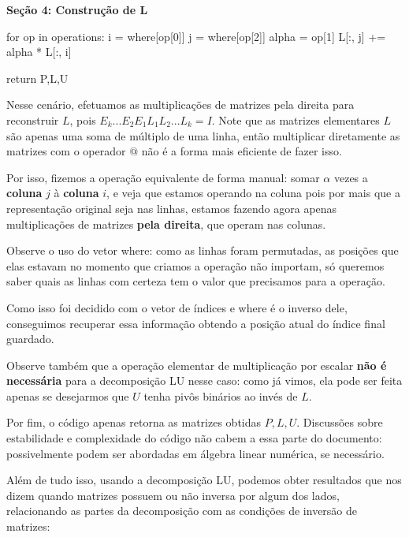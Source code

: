 \documentclass[11pt, a4paper]{article}
\begin{document}
\textbf{Seção 4: Construção de L}
\begin{code}
    for op in operations:
        i = where[op[0]]
        j = where[op[2]]
        alpha = op[1]
        L[:, j] += alpha * L[:, i]

    return P,L,U
\end{code}

Nesse cenário, efetuamos as multiplicações de matrizes pela direita para reconstruir \(L\), pois \(E_k...E_2E_1L_1L_2...L_k=I\). Note que as matrizes elementares \(L\) são apenas uma soma de múltiplo de uma linha, então multiplicar diretamente as matrizes com o operador \(@\) não é a forma mais eficiente de fazer isso.

Por isso, fizemos a operação equivalente de forma manual: somar \(\alpha\) vezes a \textbf{coluna} \(j\) à \textbf{coluna} \(i\), e veja que estamos operando na coluna pois por mais que a representação original seja nas linhas, estamos fazendo agora apenas multiplicações de matrizes \textbf{pela direita}, que operam nas colunas.

Observe o uso do vetor where: como as linhas foram permutadas, as posições que elas estavam no momento que criamos a operação não importam, só queremos saber quais as linhas com certeza tem o valor que precisamos para a operação. 

Como isso foi decidido com o vetor de índices e where é o inverso dele, conseguimos recuperar essa informação obtendo a posição atual do índice final guardado.

Observe também que a operação elementar de multiplicação por escalar \textbf{não é necessária} para a decomposição LU nesse caso: como já vimos, ela pode ser feita apenas se desejarmos que \(U\) tenha pivôs binários ao invés de \(L\).

Por fim, o código apenas retorna as matrizes obtidas \(P,L,U\). Discussões sobre estabilidade e complexidade do código não cabem a essa parte do documento: possivelmente podem ser abordadas em álgebra linear numérica, se necessário.

\void[0.5]

Além de tudo isso, usando a decomposição LU, podemos obter resultados que nos dizem quando matrizes possuem ou não inversa por algum dos lados, relacionando as partes da decomposição com as condições de inversão de matrizes:

\void[0.5]
\end{document}
